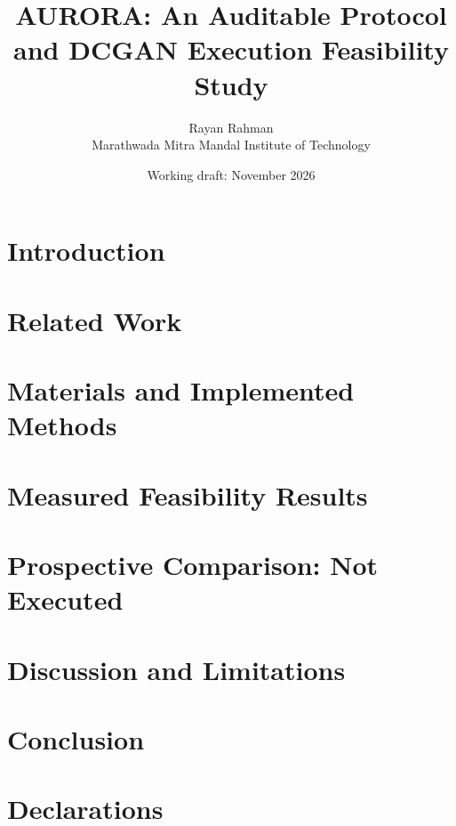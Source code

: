 \documentclass[11pt]{article}
\title{AURORA: An Auditable Protocol and DCGAN Execution Feasibility Study}
\author{Rayan Rahman\\Marathwada Mitra Mandal Institute of Technology}
\date{Working draft: November 2026}
\begin{document}
\maketitle
\begin{abstract}
\end{abstract}
\section{Introduction}
\section{Related Work}
\section{Materials and Implemented Methods}
\section{Measured Feasibility Results}
\section{Prospective Comparison: Not Executed}
\section{Discussion and Limitations}
\section{Conclusion}
\section*{Declarations}


\end{document}
